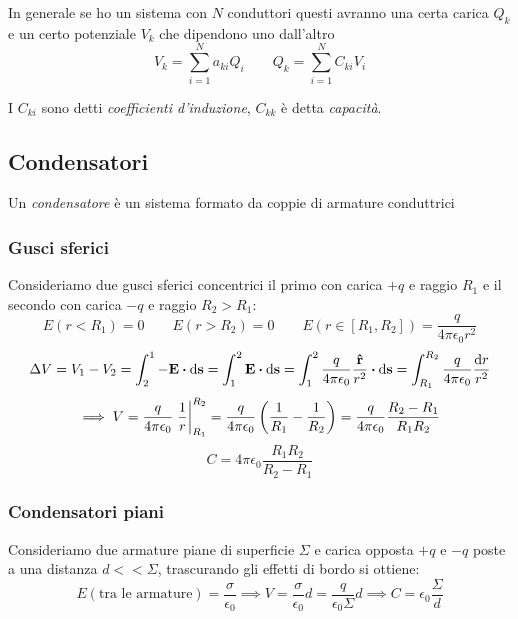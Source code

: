 \documentclass[12pt,a4paper]{article}
\begin{document}
In generale se ho un sistema con $N$ conduttori questi avranno una certa carica $Q_k$ e un certo potenziale $V_k$ che dipendono uno dall'altro
\begin{equation*}
    V_k = \sum_{i=1}^{N} a_{ki}Q_i \quad \quad Q_k = \sum_{i=1}^{N} C_{ki}V_i
\end{equation*}

I $C_{ki}$ sono detti \textit{coefficienti d'induzione}, $C_{kk}$ è detta \textit{capacità}.

\subsection{Condensatori}
\begin{definition}
    Un \textit{condensatore} è un sistema formato da coppie di armature conduttrici
\end{definition}

\subsubsection{Gusci sferici}
Consideriamo due gusci sferici concentrici il primo con carica $+q$ e raggio $R_1$ e il secondo con carica $-q$ e raggio $R_2 > R_1$:
\begin{equation*}
    E(r<R_1)=0\qquad E(r>R_2)=0\qquad E(r \in [R_1,R_2])= \frac{q}{4\pi\epsilon_0r^2}
\end{equation*}
\begin{equation*}
    \Delta V = V_1-V_2= \int_{2}^{1}-\vb{E}\vdot\dd{\vb{s}}= \int_{1}^{2}\vb{E}\vdot\dd{\vb{s}}= 
    \int_{1}^{2}\frac{q}{4\pi\epsilon_0}\frac{\vu{r}}{r^2}\vdot\dd{\vb{s}} = \int_{R_1}^{R_2}\frac{q}{4\pi\epsilon_0}\frac{\dd{r}}{r^2}
\end{equation*}
\begin{equation*}
    \implies V = \frac{q}{4\pi\epsilon_0}\eval{\frac{1}{r}}_{R_1}^{R_2}= \frac{q}{4\pi\epsilon_0}\left( \frac{1}{R_1}-\frac{1}{R_2} \right)
    = \frac{q}{4\pi\epsilon_0}\frac{R_2-R_1}{R_1R_2}
\end{equation*}
\begin{equation*}
    C = 4\pi\epsilon_0\frac{R_1R_2}{R_2-R_1}
\end{equation*}

\subsubsection{Condensatori piani}
Consideriamo due armature piane di superficie $\Sigma$ e carica opposta $+q$ e $-q$ poste a una distanza $d<<\Sigma$, trascurando gli effetti di bordo si ottiene:
\begin{equation*}
    E(\text{tra le armature})= \frac{\sigma}{\epsilon_0}\implies V = \frac{\sigma}{\epsilon_0}d = \frac{q}{\epsilon_0\Sigma}d 
    \implies C = \epsilon_0\frac{\Sigma}{d}
\end{equation*}
\end{document}
